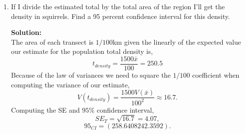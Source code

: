 \documentclass[12pt]{article}
\makeatletter
\theoremstyle{homework}
\newenvironment{exercise}[1]
{\def\@currentlabel{#1}\exercisecore}
{\endexercisecore}
\newcommand{\localhead}[1]{\par\smallskip\noindent\textbf{#1}\nobreak\\}%
\newcommand\solution{\localhead{Solution:}}
\makeatother
\begin{document}
\begin{exercise}{5}
\begin{enumerate}
        \item If I divide the estimated total by the total area of the region I'll get the density in squirrels. Find 
        a 95 percent confidence interval for this density.\\
        \solution The area of each transect is $1/100$km given the linearly of the expected value our estimate for the population total density is, 
        \begin{equation*}
            t_{density} = \dfrac{1500\bar{x}}{100} = 250.5
        \end{equation*}
        Because of the law of variances we need to square the $1/100$ coefficient when computing the variance of our estimate, 
        \begin{equation*}
            V(t_{density}) = \dfrac{1500V(\bar{x})}{100^2} \approx 16.7.
        \end{equation*}
        Computing the SE and $95\%$ confidence interval,
        \begin{equation*}
            SE_T = \sqrt{16.7} = 4.07,
        \end{equation*}
        \begin{equation*}
            95_{CI} = (258.6408 242.3592).
        \end{equation*}
    \end{enumerate}
\end{exercise}
\vspace{1in}
\end{document}
